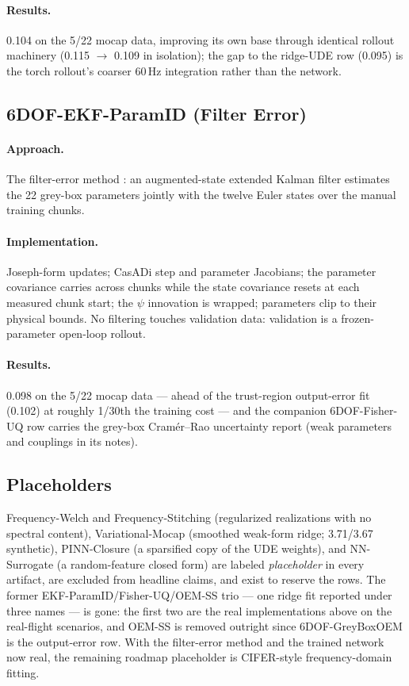 \documentclass[11pt]{article}
\begin{document}
\paragraph{Results.} 0.104 on the 5/22 mocap data, improving its own base
through identical rollout machinery (0.115 $\rightarrow$ 0.109 in
isolation); the gap to the ridge-UDE row (0.095) is the torch rollout's
coarser 60\,Hz integration rather than the network.

\subsection{6DOF-EKF-ParamID (Filter Error)}
\paragraph{Approach.} The filter-error method
\cite{jategaonkar2006flight,kalman_new_1960}: an augmented-state extended
Kalman filter estimates the 22 grey-box parameters jointly with the twelve
Euler states over the manual training chunks.
\paragraph{Implementation.} Joseph-form updates; CasADi step and parameter
Jacobians; the parameter covariance carries across chunks while the state
covariance resets at each measured chunk start; the $\psi$ innovation is
wrapped; parameters clip to their physical bounds. No filtering touches
validation data: validation is a frozen-parameter open-loop rollout.
\paragraph{Results.} 0.098 on the 5/22 mocap data --- ahead of the
trust-region output-error fit (0.102) at roughly 1/30th the training cost
--- and the companion 6DOF-Fisher-UQ row carries the grey-box Cram\'er--Rao
uncertainty report (weak parameters and couplings in its notes).

\subsection{Placeholders}
Frequency-Welch and Frequency-Stitching (regularized realizations with no
spectral content), Variational-Mocap (smoothed weak-form ridge; 3.71/3.67
synthetic), PINN-Closure (a sparsified copy of the UDE weights), and
NN-Surrogate (a random-feature closed form) are labeled \emph{placeholder}
in every artifact, are excluded from headline claims, and exist to reserve
the rows. The former EKF-ParamID/Fisher-UQ/OEM-SS trio --- one ridge fit
reported under three names --- is gone: the first two are the real
implementations above on the real-flight scenarios, and OEM-SS is removed
outright since 6DOF-GreyBoxOEM is the output-error row. With the
filter-error method and the trained network now real, the remaining
roadmap placeholder is CIFER-style frequency-domain fitting.
\end{document}
